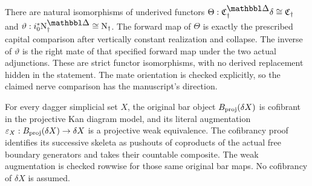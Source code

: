 \begin{resultblock}
\begin{proposition}
\label{catalogue:F8}
There are natural isomorphisms of underived functors $\Theta:\frakC^{\prism}_{\dag}\delta\cong\frakC_{\dag}$ and $\vartheta:i_0^*\N^{\prism}_{\dag}\cong\N_{\dag}$.
The forward map of $\Theta$ is exactly the prescribed capital comparison after vertically constant realization and collapse.
The inverse of $\vartheta$ is the right mate of that specified forward map under the two actual adjunctions.
These are strict functor isomorphisms, with no derived replacement hidden in the statement.
The mate orientation is checked explicitly, so the claimed nerve comparison has the manuscript's direction.
\end{proposition}

\end{resultblock}

\begin{resultblock}
\begin{proposition}
\label{catalogue:F9}
For every dagger simplicial set $X$, the original bar object $B_{\mathrm{proj}}(\delta X)$ is cofibrant in the projective Kan diagram model, and its literal augmentation $\varepsilon_X:B_{\mathrm{proj}}(\delta X)\to\delta X$ is a projective weak equivalence.
The cofibrancy proof identifies its successive skeleta as pushouts of coproducts of the actual free boundary generators and takes their countable composite.
The weak augmentation is checked rowwise for those same original bar maps.
No cofibrancy of $\delta X$ is assumed.
\end{proposition}

\end{resultblock}

